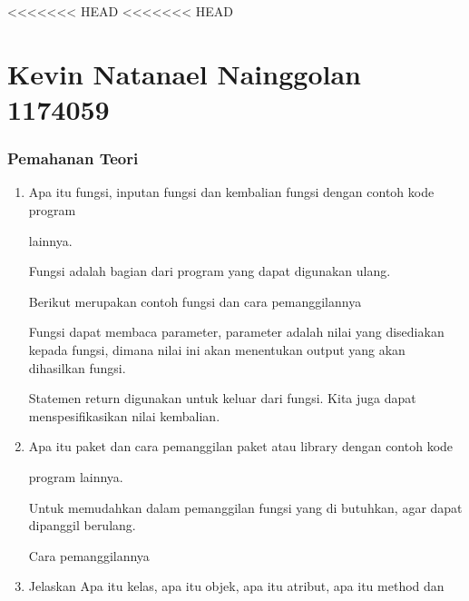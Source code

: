 <<<<<<< HEAD
<<<<<<< HEAD
\section {Kevin Natanael Nainggolan 1174059}
\subsubsection{Pemahanan Teori}

\begin{enumerate}

    \item Apa itu fungsi, inputan 
fungsi dan kembalian fungsi dengan contoh kode program

    lainnya.

    Fungsi adalah bagian dari program yang dapat digunakan ulang.

    Berikut merupakan contoh fungsi dan cara pemanggilannya

    



    Fungsi dapat membaca parameter, parameter adalah nilai yang disediakan kepada fungsi, dimana nilai ini akan menentukan output yang akan dihasilkan fungsi.

    



    Statemen return digunakan untuk keluar dari fungsi. Kita juga dapat menspesifikasikan nilai kembalian.

    



    \item Apa itu paket dan cara pemanggilan paket atau library dengan contoh kode

    program lainnya.

    Untuk memudahkan dalam pemanggilan fungsi yang di butuhkan, agar dapat dipanggil berulang.

    Cara pemanggilannya

    



    \item Jelaskan Apa itu kelas, apa itu objek, apa itu atribut, apa itu method dan


\end{enumerate}
